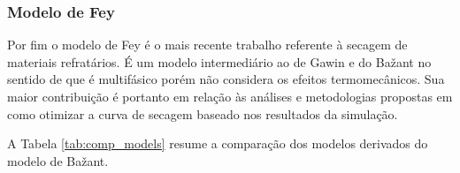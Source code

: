 \subsubsection{Modelo de Fey}
Por fim o modelo de Fey \cite{Fey2016b} é o mais recente trabalho referente à
secagem de materiais refratários. É um modelo intermediário ao de Gawin e do
Ba\v{z}ant no sentido de que é multifásico porém não considera os efeitos
termomecânicos. Sua maior contribuição é portanto em relação às análises e
metodologias propostas em como otimizar a curva de secagem baseado nos
resultados da simulação.

A Tabela \ref{tab:comp_models} resume a comparação dos modelos derivados do
modelo de Ba\v{z}ant.


    
